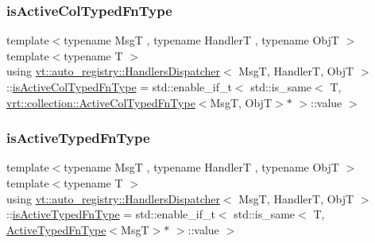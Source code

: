 \subsubsection{\texorpdfstring{is\+Active\+Col\+Typed\+Fn\+Type}{isActiveColTypedFnType}}
{\footnotesize\ttfamily template$<$typename MsgT , typename HandlerT , typename ObjT $>$ \\
template$<$typename T $>$ \\
using \hyperlink{structvt_1_1auto__registry_1_1_handlers_dispatcher}{vt\+::auto\+\_\+registry\+::\+Handlers\+Dispatcher}$<$ MsgT, HandlerT, ObjT $>$\+::\hyperlink{structvt_1_1auto__registry_1_1_handlers_dispatcher_a1c50adc2b2f2ac67f9cc793cdddbf2f5}{is\+Active\+Col\+Typed\+Fn\+Type} =  std\+::enable\+\_\+if\+\_\+t$<$ std\+::is\+\_\+same$<$ T, \hyperlink{namespacevt_1_1vrt_1_1collection_a1f4b9c5fe895842f49952a29592bc206}{vrt\+::collection\+::\+Active\+Col\+Typed\+Fn\+Type}$<$MsgT, ObjT$>$$\ast$ $>$\+::value $>$\hspace{0.3cm}{\ttfamily [private]}}

\mbox{\label{structvt_1_1auto__registry_1_1_handlers_dispatcher_ac15d047eb387381db2612c79e196f8e7}} 
\subsubsection{\texorpdfstring{is\+Active\+Typed\+Fn\+Type}{isActiveTypedFnType}}
{\footnotesize\ttfamily template$<$typename MsgT , typename HandlerT , typename ObjT $>$ \\
template$<$typename T $>$ \\
using \hyperlink{structvt_1_1auto__registry_1_1_handlers_dispatcher}{vt\+::auto\+\_\+registry\+::\+Handlers\+Dispatcher}$<$ MsgT, HandlerT, ObjT $>$\+::\hyperlink{structvt_1_1auto__registry_1_1_handlers_dispatcher_ac15d047eb387381db2612c79e196f8e7}{is\+Active\+Typed\+Fn\+Type} =  std\+::enable\+\_\+if\+\_\+t$<$ std\+::is\+\_\+same$<$ T, \hyperlink{namespacevt_a54eefd5373739c7365058b0d22fea6e2}{Active\+Typed\+Fn\+Type}$<$MsgT$>$$\ast$ $>$\+::value $>$\hspace{0.3cm}{\ttfamily [private]}}

